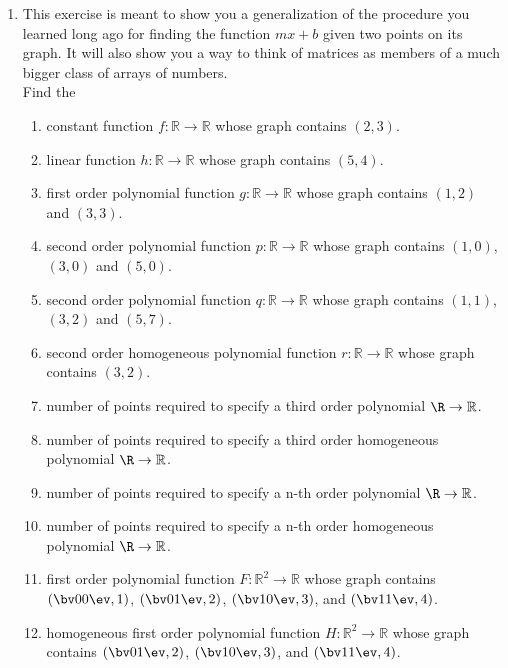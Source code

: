 \begin{enumerate}
\item This exercise is meant to show you a generalization of the procedure you learned long ago for finding the function $mx+b$  given two points on its graph. It will also show you a way to think of matrices as members of a much bigger class of arrays of numbers. \\

Find the
\begin{enumerate}
\item constant function $f:\mathbb{R}\to \mathbb{R}$ whose graph contains $(2,3)$.
\item linear function $h:\mathbb{R}\to \mathbb{R}$ whose graph contains $(5,4)$.
\item first order polynomial function $g:\mathbb{R}\to \mathbb{R}$ whose graph contains 
$(1,2)$ and $(3,3)$.
\item second order polynomial function $p:\mathbb{R}\to \mathbb{R}$ whose graph contains $(1,0)$, $(3,0)$ and $(5,0)$.
\item second order polynomial function $q:\mathbb{R}\to \mathbb{R}$ whose graph contains $(1,1)$, $(3,2)$ and $(5,7)$.
\item second order homogeneous polynomial function $r:\mathbb{R}\to \mathbb{R}$ whose graph contains $(3,2)$.\\
\item \label{3rdPoly} number of points required to specify a third order polynomial $\R\to \mathbb{R}$.
\item number of points required to specify a third order homogeneous polynomial $\R\to \mathbb{R}$.
\item number of points required to specify a n-th order polynomial $\R\to \mathbb{R}$.
\item number of points required to specify a n-th order homogeneous polynomial $\R\to \mathbb{R}$.\\
\item first order polynomial function $F:\mathbb{R}^2 \to \mathbb{R}$ whose graph contains 
$\left(  \bv 0\\0 \ev , 1\right)$, 
$\left(  \bv 0\\1 \ev , 2\right)$, 
$\left(  \bv 1\\0 \ev , 3\right)$,  and
$\left(  \bv 1\\1 \ev , 4\right)$.

\item homogeneous first order polynomial function $H:\mathbb{R}^2 \to \mathbb{R}$ whose graph contains 
$\left(  \bv 0\\1 \ev , 2\right)$, 
$\left(  \bv 1\\0 \ev , 3\right)$,  and
$\left(  \bv 1\\1 \ev , 4\right)$.


\end{enumerate}
\end{enumerate}
